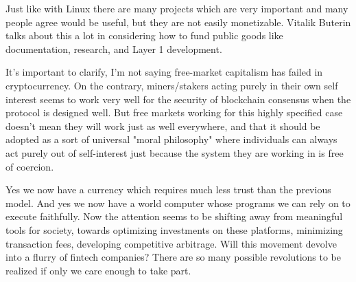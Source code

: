 Just like with Linux there are many projects which are very important and many people agree would be useful, but they are not easily monetizable. Vitalik Buterin talks about this a lot in considering how to fund public goods like documentation, research, and Layer 1 development.

It's important to clarify, I'm not saying free-market capitalism has failed in cryptocurrency. On the contrary, miners/stakers acting purely in their own self interest seems to work very well for the security of blockchain consensus when the protocol is designed well. But free markets working for this highly specified case doesn't mean they will work just as well everywhere, and that it should be adopted as a sort of universal "moral philosophy" where individuals can always act purely out of self-interest just because the system they are working in is free of coercion.

Yes we now have a currency which requires much less trust than the previous model. And yes we now have a world computer whose programs we can rely on to execute faithfully. Now the attention seems to be shifting away from meaningful tools for society, towards optimizing investments on these platforms, minimizing transaction fees, developing competitive arbitrage. Will this movement devolve into a flurry of fintech companies? There are so many possible revolutions to be realized if only we care enough to take part.
